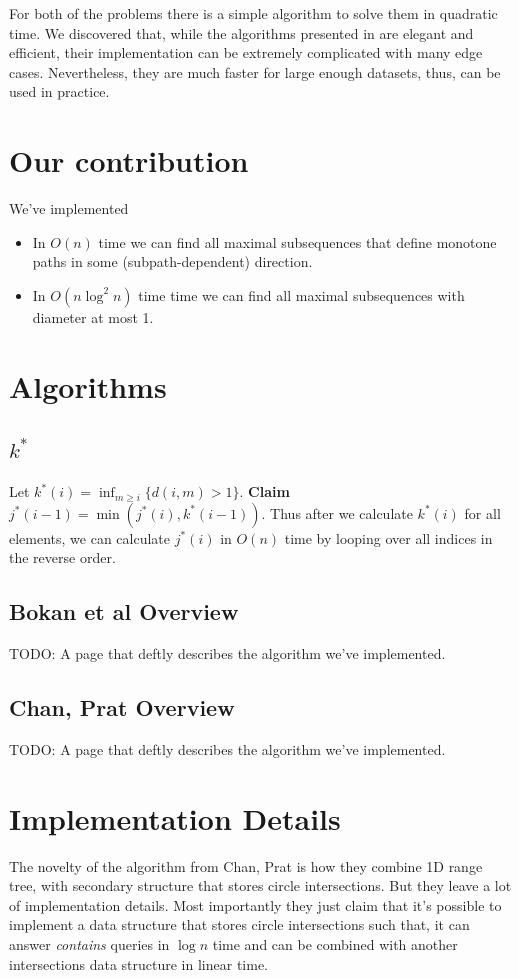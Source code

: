 \documentclass{article}
\begin{document}
For both of the problems there is a simple algorithm to solve them in quadratic time. We discovered that, while the algorithms presented in \cite{bokal_et_al:LIPIcs:2015:5113,chan_et_al:LIPIcs:2016:5920} are elegant and efficient, their implementation can be extremely complicated with many edge cases. Nevertheless, they are much faster for large enough datasets, thus, can be used in practice.

\section{Our contribution}
We've implemented
\begin{itemize}
\item In $O(n)$ time  we  can  find  all  maximal  subsequences  that  define  monotone  paths  in  some (subpath-dependent) direction. \cite{bokal_et_al:LIPIcs:2015:5113} 
\item In $O(n \log^2 n)$ time time we can find all maximal subsequences with diameter at most 1. \cite{chan_et_al:LIPIcs:2016:5920}
\end{itemize}

\section{Algorithms}
\subsection{$k^*$}

Let $k^*(i) = \inf_{m \geq i} \{d(i, m) > 1\}$. \textbf{Claim} $j^*(i-1) = \min(j^*(i), k^*(i-1))$. Thus after we calculate $k^*(i)$ for all elements, we can calculate $j^*(i)$ in $O(n)$ time by looping over all indices in the reverse order.

\subsection{Bokan et al Overview}
TODO: A page that deftly describes the algorithm we've implemented.

\subsection{Chan, Prat Overview}
TODO: A page that deftly describes the algorithm we've implemented.

\section{Implementation Details}
The novelty of the algorithm from Chan, Prat is how they combine 1D range tree, with secondary structure that stores circle intersections. But they leave a lot of implementation details. Most importantly they just claim that it's possible to implement a data structure that stores circle intersections such that, it can answer \textit{contains} queries in $\log n$ time and can be combined with another intersections data structure in linear time.
\end{document}
